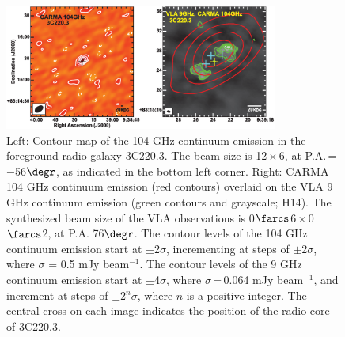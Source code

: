\documentclass[iop]{emulateapj}
\newcommand{\CO}{\mbox{CO($J$\,=\,3\,$\rightarrow$\,2) }}
\newcommand{\pmOne}{\mbox{$^{-1}$}}
\begin{document}
\begin{figure}[tbph]
\centering
\includegraphics[width=0.80\textwidth]{Figure/ContPanel_cmyk.eps}
\caption{Left: Contour map of the 104 GHz continuum emission in the foreground radio galaxy 3C220.3.
The beam size is 12\,$\times$\,6, at P.A.\,=\,
$-$56$\degr$, as indicated in the bottom left corner. Right: CARMA 104 GHz continuum emission (red contours) overlaid on the VLA 9 GHz continuum emission (green contours and grayscale; H14).
The synthesized beam size of the VLA observations is 0$\farcs$6\,$\times$\,0$\farcs$2, at P.A.
76$\degr$. The contour levels of the 104 GHz continuum emission start at $\pm$2$\sigma$, incrementing at steps
of $\pm$2$\sigma$, where $\sigma$ = 0.5 mJy beam\pmOne. The contour levels of the 9 GHz continuum
emission start at $\pm$4$\sigma$, where $\sigma$\,=\,0.064 mJy beam\pmOne, and increment at steps of $\pm$2$^n\sigma$,
where $n$ is a positive integer.
The central cross on each image indicates the position of the radio core of 3C220.3. \label{fig:cont}}
\end{figure}
\end{document}
